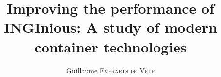 \documentclass{resources/EPL-master-thesis-covers-EN}
\title{Improving the performance of INGInious: A study of modern container technologies}
\author{Guillaume \textsc{Everarts de Velp}}
\begin{document}
  \maketitle
  
  
  
  
  \tableofcontents
  
  
  
  
  
  
  
  
  \appendix
  
  
  {}
  

  \backcoverpage
\end{document}
